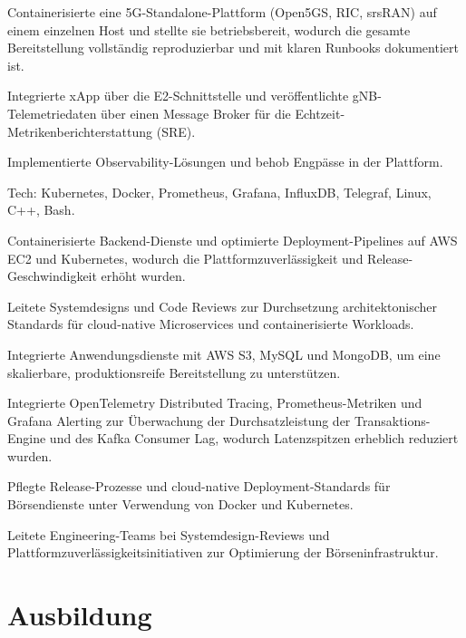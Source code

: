 \documentclass[10pt,a4paper]{resume}
\begin{document}
\bullets
  \item Containerisierte eine 5G-Standalone-Plattform (Open5GS, RIC, srsRAN) auf einem einzelnen Host und stellte sie betriebsbereit, wodurch die gesamte Bereitstellung vollständig reproduzierbar und mit klaren Runbooks dokumentiert ist.
  \item Integrierte xApp über die E2-Schnittstelle und veröffentlichte gNB-Telemetriedaten über einen Message Broker für die Echtzeit-Metrikenberichterstattung (SRE).
  \item Implementierte Observability-Lösungen und behob Engpässe in der Plattform.
  \item Tech: Kubernetes, Docker, Prometheus, Grafana, InfluxDB, Telegraf, Linux, C++, Bash.
\bulletsend
\vspace{1.5pt}
\bullets
  \item Containerisierte Backend-Dienste und optimierte Deployment-Pipelines auf AWS EC2 und Kubernetes, wodurch die Plattformzuverlässigkeit und Release-Geschwindigkeit erhöht wurden.
  \item Leitete Systemdesigns und Code Reviews zur Durchsetzung architektonischer Standards für cloud-native Microservices und containerisierte Workloads.
  \item Integrierte Anwendungsdienste mit AWS S3, MySQL und MongoDB, um eine skalierbare, produktionsreife Bereitstellung zu unterstützen.
\bulletsend
\vspace{1.5pt}
\bullets
  \item Integrierte OpenTelemetry Distributed Tracing, Prometheus-Metriken und Grafana Alerting zur Überwachung der Durchsatzleistung der Transaktions-Engine und des Kafka Consumer Lag, wodurch Latenzspitzen erheblich reduziert wurden.
  \item Pflegte Release-Prozesse und cloud-native Deployment-Standards für Börsendienste unter Verwendung von Docker und Kubernetes.
  \item Leitete Engineering-Teams bei Systemdesign-Reviews und Plattformzuverlässigkeitsinitiativen zur Optimierung der Börseninfrastruktur.
\bulletsend
\vspace{1.5pt}

\section{Ausbildung}
\end{document}
